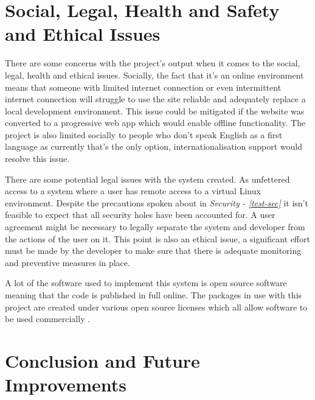 \documentclass[12pt, a4paper]{extreport}
\begin{document}
\pagebreak


\chapter{Social, Legal, Health and Safety and Ethical Issues}


There are some concerns with the project's output when it comes to the social, legal, health and ethical issues. Socially, the fact that it's an online environment means that someone with limited internet connection or even intermittent internet connection will struggle to use the site reliable and adequately replace a local development environment. This issue could be mitigated if the website was converted to a progressive web app which would enable offline functionality. The project is also limited socially to people who don't speak English as a first language as currently that's the only option, internationalisation support would resolve this issue.

There are some potential legal issues with the system created. As unfettered access to a system where a user has remote access to a virtual Linux environment. Despite the precautions spoken about in \textit{Security - \ref{test-sec}} it isn't feasible to expect that all security holes have been accounted for. A user agreement might be necessary to legally separate the system and developer from the actions of the user on it. This point is also an ethical issue, a significant effort must be made by the developer to make sure that there is adequate monitoring and preventive measures in place.

A lot of the software used to implement this system is open source software meaning that the code is published in full online. The packages in use with this project are created under various open source licenses which all allow software to be used commercially \cite{opensource-licenses}.

\pagebreak


\chapter{Conclusion and Future Improvements} \label{conclusion}
\end{document}
